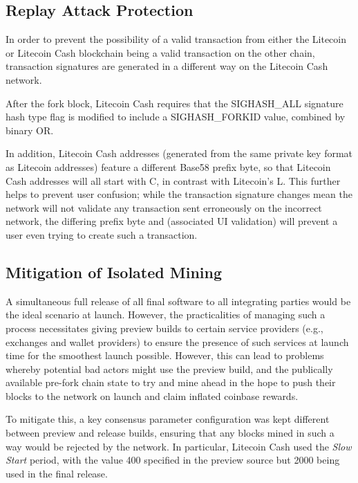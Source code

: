 \documentclass{IOS-Book-Article}
\begin{document}
\subsection{Replay Attack Protection}

In order to prevent the possibility of a valid transaction from either the Litecoin or Litecoin Cash blockchain being a valid transaction on the other chain, transaction signatures are generated in a different way on the Litecoin Cash network.

After the fork block, Litecoin Cash requires that the SIGHASH\_ALL signature hash type flag is modified to include a SIGHASH\_FORKID value, combined by binary OR. 

In addition, Litecoin Cash addresses (generated from the same private key format as Litecoin addresses) feature a different Base58 prefix byte, so that Litecoin Cash addresses will all start with C, in contrast with Litecoin's L. This further helps to prevent user confusion; while the transaction signature changes mean the network will not validate any transaction sent erroneously on the incorrect network, the differing prefix byte and (associated UI validation) will prevent a user even trying to create such a transaction.

\subsection{Mitigation of Isolated Mining}

A simultaneous full release of all final software to all integrating parties would be the ideal scenario at launch. 
However, the practicalities of managing such a process necessitates giving preview builds to certain service providers 
(e.g., exchanges and wallet providers) to ensure the presence of such services at launch time for the smoothest launch possible. 
However, this can lead to problems whereby potential bad actors might use the preview build, and the publically available pre-fork chain state 
to try and mine ahead in the hope to push their blocks to the network on launch and claim inflated coinbase rewards.

To mitigate this, a key consensus parameter configuration was kept different between preview and release builds, 
ensuring that any blocks mined in such a way would be rejected by the network. In particular, Litecoin Cash used the 
\textit{Slow Start} period, with the value 400 specified in the preview source but 2000 being used in the final release.
\end{document}
